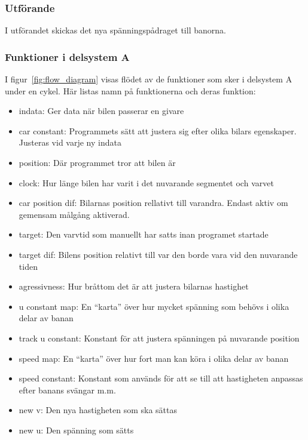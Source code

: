     \subsubsection{Utförande}

    	I utförandet skickas det nya spänningspådraget till banorna. 

      \subsubsection{Funktioner i delsystem A} \label{sec:system_a_funcs}

    I figur~\ref{fig:flow_diagram}  visas flödet av de funktioner som sker i delsystem A under en cykel.
    Här listas namn på funktionerna och deras funktion:
    \begin{itemize}
      \item indata: Ger data när bilen passerar en givare
      \item car constant: Programmets sätt att justera sig efter olika bilars egenskaper. Justeras vid varje ny indata
      \item position: Där programmet tror att bilen är
      \item clock: Hur länge bilen har varit i det nuvarande segmentet och varvet
      \item car position dif: Bilarnas position rellativt till varandra. Endast aktiv om gemensam målgång aktiverad.
      \item target: Den varvtid som manuellt har satts inan programet startade
      \item target dif: Bilens position relativt till var den borde vara vid den nuvarande tiden
      \item agressivness: Hur bråttom det är att justera bilarnas hastighet 
      \item u constant map: En ``karta'' över hur mycket spänning som behövs i olika delar av banan
      \item track u constant: Konstant för att justera spänningen på nuvarande position
      \item speed map: En ``karta'' över hur fort man kan köra i olika delar av banan		
      \item speed constant: Konstant som används för att se till att hastigheten anpassas efter banans svängar m.m.
      \item new v: Den nya hastigheten som ska sättas
      \item new u: Den spänning som sätts
    \end{itemize}

